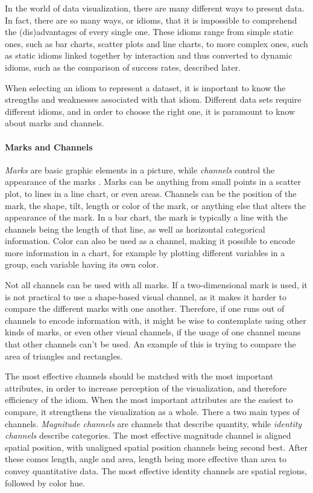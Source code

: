 \documentclass[Report.tex]{subfiles}
\begin{document}
In the world of data visualization, there are many different ways to present
data. In fact, there are so many ways, or idioms, that it is impossible to
comprehend the (dis)advantages of every single one. These idioms range from
simple static ones, such as bar charts, scatter plots and line charts, to
more complex ones, such as static idioms linked together by interaction and thus converted to dynamic idioms,
such as the comparison of success rates, described later. 

When selecting an idiom to represent a dataset, it is important to know the
strengths and weaknesses associated with that idiom. Different data sets
require different idioms, and in order to choose the right one, it is paramount
to know about marks and channels. 
\paragraph{Marks and Channels\\}
\emph{Marks} are basic graphic elements in a picture, while \emph{channels} control the
appearance of the marks \cite[Chapter 5, p. 95-96]{Tamara}. Marks can be anything 
from small points in a scatter plot, to lines in a line
chart, or even areas. Channels can be the position of the mark, the shape, tilt,
length or color of the mark, or anything else that alters the appearance of the
mark.
In a bar chart, the mark is typically a line with the channels being the length
of that line, as well as horizontal categorical information. Color can also be used as a channel,
making it possible to encode more information in a chart, for example by
plotting different variables in a group, each variable having its own color. 

Not all channels can be used with all marks. If a two-dimensional mark is used, 
it is not practical to use a shape-based visual channel, as it makes it
harder to compare the different marks with one another. Therefore, if one runs out
of channels to encode information with, it might be wise to contemplate using
other kinds of marks, or even other visual channels, if the usage of one channel
means that other channels can't be used. An example of this is trying to compare 
the area of triangles and rectangles.

The most effective channels should be matched with the most important
attributes, in order to increase perception of the visualization, and therefore
efficiency of the idiom. When the most important attributes are the easiest to
compare, it strengthens the visualization as a whole. 
There a two main types of channels. \emph{Magnitude channels} are channels that describe quantity, 
while \emph{identity channels} describe categories.
The most effective magnitude channel is
aligned spatial position, with unaligned spatial position channels being second
best. After these comes length, angle and area,
length being more effective than area to convey quantitative data. 
The most effective identity channels are
spatial regions, followed by color hue\cite[Chapter 5, p. 101]{Tamara}.
\end{document}

